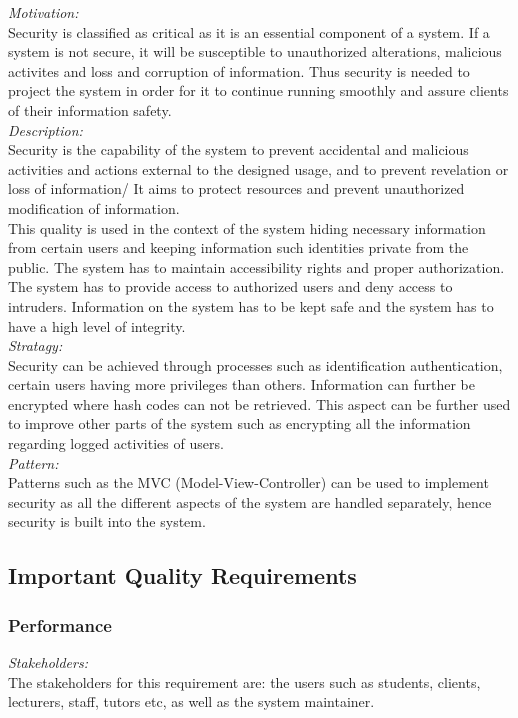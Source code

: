 \documentclass[a4paper,12pt]{report}
\begin{document}
		\emph{Motivation: }\\ Security is classified as critical as it is an essential component of a system. If a system is not secure, it will be susceptible to unauthorized alterations, malicious activites and loss and corruption of information. Thus security is needed to project the system in order for it to continue running smoothly and assure clients of their information safety. \\
		
		\emph{Description: }\\ Security is the capability of the system to prevent accidental  and malicious activities and actions external to the designed usage, and to prevent revelation or loss of information/ It aims to protect resources and prevent unauthorized modification of information.\\
		This quality is used in the context of the system hiding necessary information from certain users and keeping information such identities private from the public. The system has to maintain accessibility rights and proper authorization. The system has to provide access to authorized users and deny access to intruders. Information on the system has to be kept safe and the system has to have a high level of integrity.\\
		
		\emph{Stratagy: }\\ Security can be achieved through processes such as identification authentication, certain users having more privileges than others. Information can further be encrypted where hash codes can not be retrieved. This aspect can be further used to improve other parts of the system such as encrypting all the information regarding logged activities of users.\\
		
		\emph{Pattern: } \\ Patterns such as the MVC (Model-View-Controller) can be used to implement security as all the different aspects of the system are handled separately, hence security is built into the system.\\
		
	\subsection{Important Quality Requirements}
		\subsubsection{Performance}
		\emph{Stakeholders: }\\ The stakeholders for this requirement are: the users such as students, clients, lecturers, staff, tutors etc, as well as the system maintainer.\\
		
\end{document}
